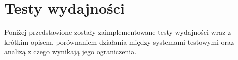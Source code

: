\chapter{Testy wydajności}
Poniżej przedstawione zostały zaimplementowane testy wydajności wraz z krótkim opisem, porównaniem działania między systemami testowymi oraz analizą z czego wynikają jego ograniczenia.